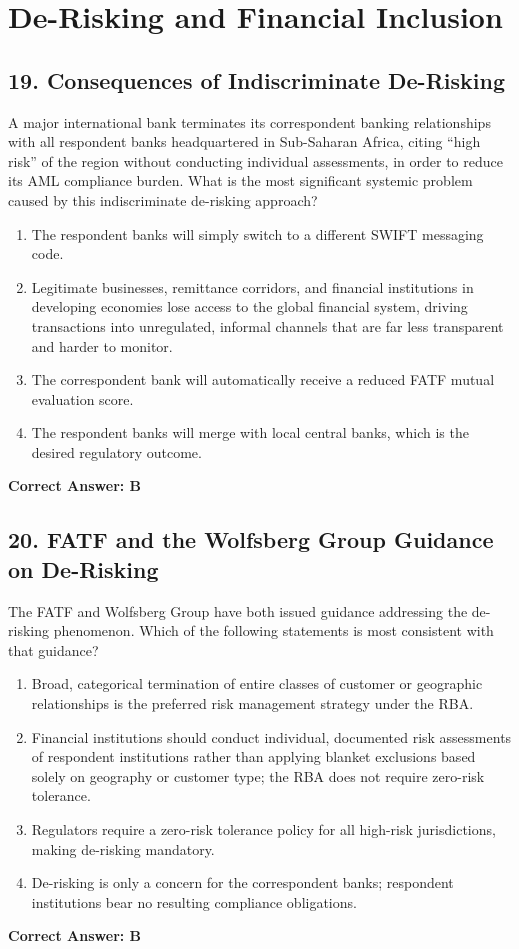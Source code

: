 \documentclass[11pt,a4paper]{article}
\begin{document}
	\section{De-Risking and Financial Inclusion}
	
	\subsection{19. Consequences of Indiscriminate De-Risking}
	A major international bank terminates its correspondent banking relationships with all respondent banks headquartered in Sub-Saharan Africa, citing ``high risk'' of the region without conducting individual assessments, in order to reduce its AML compliance burden. What is the most significant systemic problem caused by this indiscriminate de-risking approach?
	\begin{enumerate}[label=\Alph*.]
		\item The respondent banks will simply switch to a different SWIFT messaging code.
		\item Legitimate businesses, remittance corridors, and financial institutions in developing economies lose access to the global financial system, driving transactions into unregulated, informal channels that are far less transparent and harder to monitor.
		\item The correspondent bank will automatically receive a reduced FATF mutual evaluation score.
		\item The respondent banks will merge with local central banks, which is the desired regulatory outcome.
	\end{enumerate}
	\textbf{Correct Answer: B}
	
	\subsection{20. FATF and the Wolfsberg Group Guidance on De-Risking}
	The FATF and Wolfsberg Group have both issued guidance addressing the de-risking phenomenon. Which of the following statements is most consistent with that guidance?
	\begin{enumerate}[label=\Alph*.]
		\item Broad, categorical termination of entire classes of customer or geographic relationships is the preferred risk management strategy under the RBA.
		\item Financial institutions should conduct individual, documented risk assessments of respondent institutions rather than applying blanket exclusions based solely on geography or customer type; the RBA does not require zero-risk tolerance.
		\item Regulators require a zero-risk tolerance policy for all high-risk jurisdictions, making de-risking mandatory.
		\item De-risking is only a concern for the correspondent banks; respondent institutions bear no resulting compliance obligations.
	\end{enumerate}
	\textbf{Correct Answer: B}
	
\end{document}
